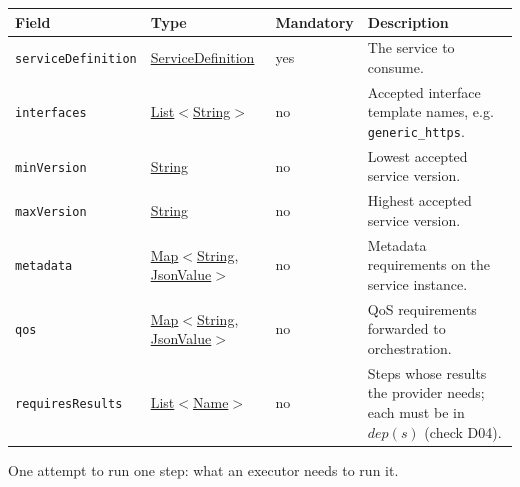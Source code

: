 \documentclass[a4paper]{arrowhead}
\newcommand{\pref}[1]{{\textcolor{ArrowheadGrey}{\hyperref[sec:model:primitives:#1]{#1}}}}
\begin{document}
{\small
\begin{longtable}{|p{3.7cm}|p{4.2cm}|p{1.6cm}|p{6.3cm}|}

\hline
\rowcolor{gray!33} Field & Type & Mandatory & Description \\ \hline
\endhead
\texttt{serviceDefinition} & \pref{ServiceDefinition} & yes & The service to consume. \\ \hline
\texttt{interfaces} & \pref{List}$<$\pref{String}$>$ & no & Accepted interface template names, e.g. \texttt{generic\_https}. \\ \hline
\texttt{minVersion} & \pref{String} & no & Lowest accepted service version. \\ \hline
\texttt{maxVersion} & \pref{String} & no & Highest accepted service version. \\ \hline
\texttt{metadata} & \pref{Map}$<$\pref{String}, \pref{JsonValue}$>$ & no & Metadata requirements on the service instance. \\ \hline
\texttt{qos} & \pref{Map}$<$\pref{String}, \pref{JsonValue}$>$ & no & QoS requirements forwarded to orchestration. \\ \hline
\texttt{requiresResults} & \pref{List}$<$\pref{Name}$>$ & no & Steps whose results the provider needs; each must be in $dep(s)$ (check D04). \\ \hline
\end{longtable}
}

One attempt to run one step: what an executor needs to run it.
\end{document}
